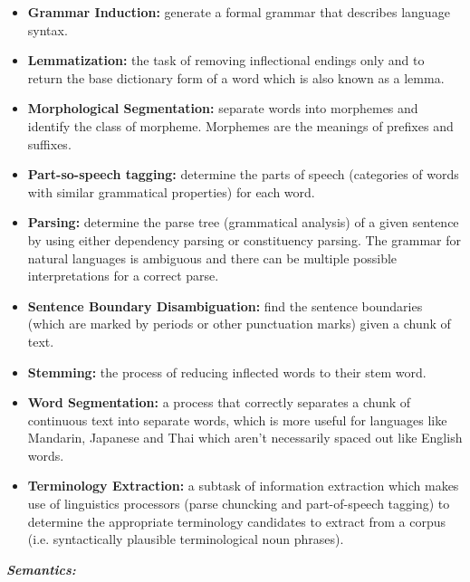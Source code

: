 \documentclass{article}
\begin{document}
\begin{itemize}
    \item \textbf{Grammar Induction:} generate a formal grammar that describes language syntax. 
    \item \textbf{Lemmatization:} the task of removing inflectional endings only and to return the base dictionary form of a word which is also known as a lemma.
    \item \textbf{Morphological Segmentation:} separate words into morphemes and identify the class of morpheme. Morphemes are the meanings of prefixes and suffixes. 
    \item \textbf{Part-so-speech tagging:} determine the parts of speech (categories of words with similar grammatical properties) for each word.
    \item \textbf{Parsing:} determine the parse tree (grammatical analysis) of a given sentence by using either dependency parsing or constituency parsing. The grammar for natural languages is ambiguous and there can be multiple possible interpretations for a correct parse.   
    \item \textbf{Sentence Boundary Disambiguation:} find the sentence boundaries (which are marked by periods or other punctuation marks) given a chunk of text.
    \item \textbf{Stemming:} the process of reducing inflected words to their stem word. 
    \item \textbf{Word Segmentation:} a process that correctly separates a chunk of continuous text into separate words, which is more useful for languages like Mandarin, Japanese and Thai which aren't necessarily spaced out like English words. 
    \item \textbf{Terminology Extraction:} a subtask of information extraction which makes use of linguistics processors (parse chuncking and part-of-speech tagging) to determine the appropriate terminology candidates to extract from a corpus (i.e. syntactically plausible terminological noun phrases).
\end{itemize}

\newpage 

\hspace{-0.4cm} \textbf{\textit{Semantics:}} 

\vspace{0.25cm}
\end{document}
